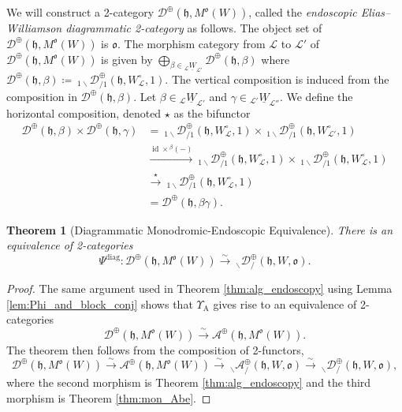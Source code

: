 \documentclass{amsart}
\newcommand{\scrA}{\mathcal{A}}
\newcommand{\scrL}{\mathcal{L}}
\DeclareMathOperator{\id}{id}
\newcommand{\fr}[1]{\mathfrak{#1}}
\DeclareMathOperator{\diag}{diag}
\DeclareMathOperator{\Abe}{A}
\newcommand{\EW}{\mathcal{D}}
\newcommand{\EWmon}[2]{\:_{#1 \backslash} \mathcal{D}_{/ #2} }
\newcommand{\Amon}[2]{\:_{#1 \backslash} \mathcal{A}_{/ #2} }
\newcommand{\uW}[2]{{}_{#1}\underline{W}_{#2}}
\newtheorem{theorem}[subsubsection]{Theorem}
\theoremstyle{definition}
\numberwithin{equation}{subsection}
\begin{document}
We will construct a 2-category $\EW^{\oplus} (\fr{h}, M^{\fr{o}} (W))$, called the \emph{endoscopic Elias--Williamson diagrammatic 2-category} as follows. 
The object set of $\EW^{\oplus} (\fr{h}, M^{\fr{o}} (W))$ is $\fr{o}$.
The morphism category from $\scrL$ to $\scrL'$ of $\EW^{\oplus} (\fr{h}, M^{\fr{o}} (W))$ is given by $\bigoplus_{\beta \in \uW{\scrL}{\scrL'}} \EW^{\oplus} (\fr{h}, \beta)$ where $\EW^{\oplus} (\fr{h}, \beta) \coloneq \EWmon{1}{1}^{\oplus} (\fr{h}, W_{\scrL}^{\circ}, 1)$.
The vertical composition is induced from the composition in $\EW^{\oplus} (\fr{h}, \beta)$. Let $\beta \in \uW{\scrL}{\scrL'}$ and $\gamma \in \uW{\scrL'}{\scrL''}$. 
We define the horizontal composition, denoted $\star$ as the bifunctor
\begin{align*}
    \EW^{\oplus} (\fr{h}, \beta) \times \EW^{\oplus} (\fr{h}, \gamma) &= \EWmon{1}{1}^{\oplus} (\fr{h}, W_{\scrL}^{\circ}, 1) \times \EWmon{1}{1}^{\oplus} (\fr{h}, W_{\scrL'}^{\circ}, 1) \\
    &\stackrel{\id \times {}^{\beta} (-) }{\longrightarrow} \EWmon{1}{1}^{\oplus} (\fr{h}, W_{\scrL}^{\circ}, 1) \times \EWmon{1}{1}^{\oplus} (\fr{h}, W_{\scrL}^{\circ}, 1) \\
    &\stackrel{\star}{\to} \EWmon{1}{1}^{\oplus} (\fr{h}, W_{\scrL}^{\circ}, 1) \\
    &= \EW^{\oplus} (\fr{h}, \beta \gamma).
\end{align*}

\begin{theorem}[Diagrammatic Monodromic-Endoscopic Equivalence]\label{thm:diag_endoscopy}
    There is an equivalence of 2-categories
    \[ \Psi^{\diag} : \EW^{\oplus} (\fr{h}, M^{\fr{o}} (W)) \stackrel{\sim}{\to} \EWmon{}{}^{\oplus} (\fr{h}, W, \fr{o}).\]
\end{theorem}
\begin{proof}
    The same argument used in Theorem \ref{thm:alg_endoscopy} using Lemma \ref{lem:Phi_and_block_conj} shows that $\Upsilon_{\Abe}$ gives rise to an equivalence of 2-categories
    \[ \EW^{\oplus} (\fr{h}, M^{\fr{o}} (W)) \stackrel{\sim}{\to} \scrA^{\oplus} (\fr{h}, M^{\fr{o}} (W)).\]
    The theorem then follows from the composition of 2-functors,
   \[
   \EW^{\oplus} (\fr{h}, M^{\fr{o}} (W)) \stackrel{\sim}{\to} \scrA^{\oplus} (\fr{h}, M^{\fr{o}} (W)) \stackrel{\sim}{\to} \Amon{}{}^{\oplus} (\fr{h}, W, \fr{o}) \stackrel{\sim}{\to} \EWmon{}{}^{\oplus} (\fr{h}, W, \fr{o}),
   \]
   where the second morphism is Theorem \ref{thm:alg_endoscopy} and the third morphism is Theorem \ref{thm:mon_Abe}. 
\end{proof}
\end{document}
